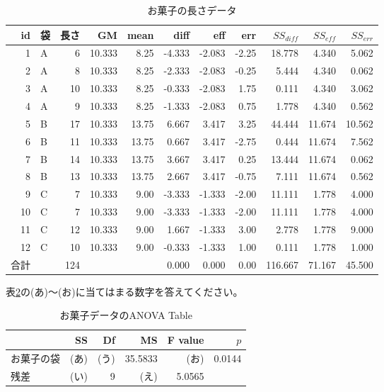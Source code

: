 \documentclass{ltjbook}
\begin{document}
\begin{table}
  \centering
  \caption{お菓子の長さデータ}
  \begin{tabular}[t]{rlrrrrrrrrr}
  id & 袋 & 長さ & GM & mean & diff & eff & err & $SS_{diff}$ & $SS_{eff}$ &$SS_{err}$\\\hline\hline
  1 & A & 6 & 10.333 & 8.25 & -4.333 & -2.083 & -2.25 & 18.778 & 4.340 & 5.062\\
  2 & A & 8 & 10.333 & 8.25 & -2.333 & -2.083 & -0.25 & 5.444 & 4.340 & 0.062\\
  3 & A & 10 & 10.333 & 8.25 & -0.333 & -2.083 & 1.75 & 0.111 & 4.340 & 3.062\\
  4 & A & 9 & 10.333 & 8.25 & -1.333 & -2.083 & 0.75 & 1.778 & 4.340 & 0.562\\
  5 & B & 17 & 10.333 & 13.75 & 6.667 & 3.417 & 3.25 & 44.444 & 11.674 & 10.562\\
  6 & B & 11 & 10.333 & 13.75 & 0.667 & 3.417 & -2.75 & 0.444 & 11.674 & 7.562\\
  7 & B & 14 & 10.333 & 13.75 & 3.667 & 3.417 & 0.25 & 13.444 & 11.674 & 0.062\\
  8 & B & 13 & 10.333 & 13.75 & 2.667 & 3.417 & -0.75 & 7.111 & 11.674 & 0.562\\
  9 & C & 7 & 10.333 & 9.00 & -3.333 & -1.333 & -2.00 & 11.111 & 1.778 & 4.000\\
  10 & C & 7 & 10.333 & 9.00 & -3.333 & -1.333 & -2.00 & 11.111 & 1.778 & 4.000\\
  11 & C & 12 & 10.333 & 9.00 & 1.667 & -1.333 & 3.00 & 2.778 & 1.778 & 9.000\\
  12 & C & 10 & 10.333 & 9.00 & -0.333 & -1.333 & 1.00 & 0.111 & 1.778 & 1.000\\\hline
 合計 &  & 124 &  &  & 0.000 & 0.000 & 0.00 & 116.667 & 71.167 & 45.500\\\hline
  \end{tabular}
  \label{anovaExample1}
\end{table}
表\ref{Example1Ans}の(あ)〜(お)に当てはまる数字を答えてください。
\begin{table}[ht]
  \centering
  \caption{お菓子データのANOVA Table} 
  \begin{tabular}{lrrrrr}
    \hline
   & SS & Df & MS & F value & $p$ \\ 
    \hline
  お菓子の袋   & (あ) & (う) & 35.5833 & (お) & 0.0144 \\ 
  残差         & (い) &  9   & (え)    & 5.0565 &  \\ 
  \hline
  \end{tabular}
  \label{Example1Ans}
\end{table}
\end{document}
